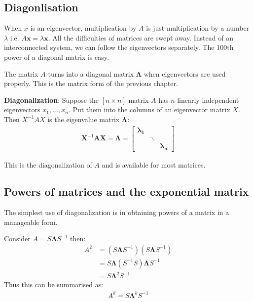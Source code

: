 \documentclass[10pt,a4paper]{article}
\begin{document}
\pagebreak
\subsection{Diagonlisation}

When $x$ is an eigenvector, multiplication by $A$ is just multiplication by a number $\lambda$ i.e.
$A \textbf{x} = \lambda \textbf{x}$. All the difficulties of matrices are swept away. Instead of an interconnected 
system, we can follow the eigenvectors separately. The 100th power of a diagonal matrix is easy. 

The matrix $A$ turns into a diagonal matrix $\mathbf{\Lambda}$ when eigenvectors are used properly. This is the
matrix form of the previous chapter.  

\textbf{Diagonalization}: Suppose the $[n\times n]$ matrix $A$ has $n$ linearly independent eigenvectors 
$x_1,...,x_n$. Put them into the columns of an eigenvector matrix $X$. Then $X^{-1} AX$ is the eigenvalue matrix  $\mathbf{\Lambda}$: 
\begin{align*}
    \boldsymbol{X}^{-1} \boldsymbol{A} \boldsymbol{X}=\boldsymbol{\Lambda}=\left[\begin{array}{lll}
        \boldsymbol{\lambda}_{\mathbf{1}} \\
        & \ddots \\
        & & \boldsymbol{\lambda}_{\boldsymbol{n}}
        \end{array}\right]
\end{align*}

This is the diagonalization of $A$ and is available for most matrices.

\subsection{Powers of matrices and the exponential matrix}

The simplest use of diagonalization is in obtaining powers of a matrix in a manageable form.

Consider $A = S \mathbf{\Lambda} S^{-1}$ then:
\begin{align*}
    A^2 &= (S \mathbf{\Lambda} S^{-1})(S \mathbf{\Lambda} S^{-1}) \\
    &= S \mathbf{\Lambda} (S^{-1} S) \mathbf{\Lambda} S^{-1} \\
    &= S \mathbf{\Lambda}^2 S^{-1}
\end{align*}
Thus this can be summarised as:
\begin{align*}
    A^k = S \mathbf{\Lambda}^k S^{-1}
\end{align*}
\end{document}
